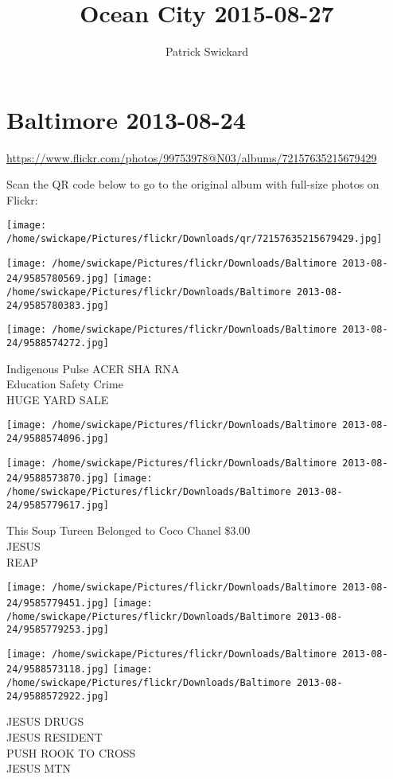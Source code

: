 \documentclass[10pt,letterpaper]{article}
\title{Ocean City 2015-08-27}
\author{Patrick Swickard}
\date{}
\begin{document}
\section*{Baltimore 2013-08-24}

\url{https://www.flickr.com/photos/99753978@N03/albums/72157635215679429}

Scan the QR code below to go to the original album with full-size photos on Flickr:

\texttt{[image: /home/swickape/Pictures/flickr/Downloads/qr/72157635215679429.jpg]}
\pagebreak

\texttt{[image: /home/swickape/Pictures/flickr/Downloads/Baltimore 2013-08-24/9585780569.jpg]}
\texttt{[image: /home/swickape/Pictures/flickr/Downloads/Baltimore 2013-08-24/9585780383.jpg]}

\texttt{[image: /home/swickape/Pictures/flickr/Downloads/Baltimore 2013-08-24/9588574272.jpg]}

Indigenous Pulse ACER SHA RNA\\
Education Safety Crime\\
HUGE YARD SALE
\pagebreak

\texttt{[image: /home/swickape/Pictures/flickr/Downloads/Baltimore 2013-08-24/9588574096.jpg]}

\vspace{0.25in}
\texttt{[image: /home/swickape/Pictures/flickr/Downloads/Baltimore 2013-08-24/9588573870.jpg]}
\texttt{[image: /home/swickape/Pictures/flickr/Downloads/Baltimore 2013-08-24/9585779617.jpg]}

This Soup Tureen Belonged to Coco Chanel \$3.00\\
JESUS\\
REAP
\pagebreak

\texttt{[image: /home/swickape/Pictures/flickr/Downloads/Baltimore 2013-08-24/9585779451.jpg]}
\texttt{[image: /home/swickape/Pictures/flickr/Downloads/Baltimore 2013-08-24/9585779253.jpg]}

\texttt{[image: /home/swickape/Pictures/flickr/Downloads/Baltimore 2013-08-24/9588573118.jpg]}
\texttt{[image: /home/swickape/Pictures/flickr/Downloads/Baltimore 2013-08-24/9588572922.jpg]}

JESUS DRUGS\\
JESUS RESIDENT\\
PUSH ROOK TO CROSS\\
JESUS MTN
\pagebreak
\end{document}
